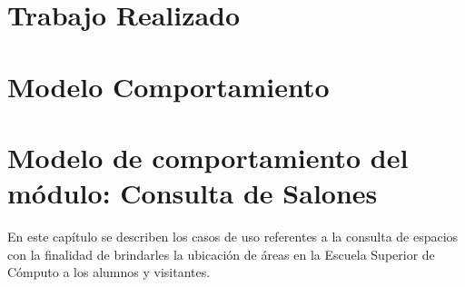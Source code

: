 %

%    
\chapter{Trabajo Realizado}\label{chp:trabajoRealizado}
\chapter{Modelo Comportamiento}\label{chp:modeloComportamiento}

\chapter{Modelo de comportamiento del módulo: Consulta de Salones \label{chp:modeloComportamientoProfesores}}
En este capítulo se describen los casos de uso referentes a la consulta de espacios con la finalidad de brindarles la ubicación de áreas en la Escuela Superior de Cómputo a los alumnos y visitantes. \bigskip

